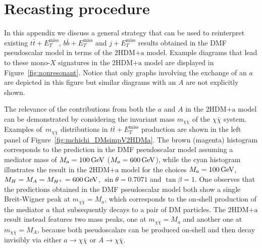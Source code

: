 \documentclass[a4paper, 11pt,notoc]{article}
\newcommand{\MET}{\ensuremath{E_T^\mathrm{miss}}\xspace}
\newcommand{\mA}{\ensuremath{M_{A}}\xspace}
\newcommand{\ma}{\ensuremath{M_{a}}\xspace}
\newcommand{\mH}{\ensuremath{M_{H}}\xspace}
\newcommand{\mHc}{\ensuremath{M_{H^{\pm}}}\xspace}
\newcommand{\hdma}{\ensuremath{\textrm{2HDM+a}}\xspace}
\begin{document}
\appendix

\section{Recasting procedure}
\label{app:recast}

In this appendix we discuss  a general strategy that can be used to reinterpret existing $t \bar t + \MET$, $b \bar b + \MET$ and $j + \MET$ results obtained in the DMF pseudoscalar model in terms of the \hdma model. Example diagrams that lead to these mono-$X$ signatures in the \hdma model are displayed in Figure~\ref{fig:nonresonant}. Notice that only graphs involving the exchange of an $a$ are depicted in this figure but similar diagrams  with an  $A$ are not explicitly shown. 

 The relevance of the contributions from both the $a$ and $A$ in the \hdma model can be  demonstrated by considering the invariant mass $m_{\chi \bar \chi}$ of the $\chi \bar \chi$ system. Examples of~$m_{\chi \bar \chi}$ distributions in $t \bar t + \MET$ production are shown in the left panel of Figure~\ref{fig:mchichi_DMsimpV2HDMa}. The brown (magenta) histogram corresponds to the prediction in the DMF pseudoscalar model assuming a mediator mass of $\ma =100 \, {\rm  GeV}$ ($\ma =600 \, {\rm  GeV}$), while the cyan histogram illustrates the result in the \hdma model for the choices $\ma = 100 \, {\rm  GeV}$, $\mH = \mA = \mHc = 600 \, {\rm  GeV}$, $\sin\theta=0.7071$ and $\tan\beta=1$. One observes that the predictions obtained in the  DMF pseudoscalar model both show a single  Breit-Wigner  peak  at $m_{\chi \bar \chi} = \ma$, which corresponds to the on-shell production of the mediator $a$ that subsequently decays to a pair of DM particles. The \hdma result instead features two mass peaks, one at $m_{\chi \bar \chi} = \ma$ and another one at $m_{\chi \bar \chi} = \mA$, because both pseudoscalars can be produced on-shell and then decay invisibly via either $a \to \chi \bar \chi$ or $A \to \chi \bar \chi$.  
\end{document}
